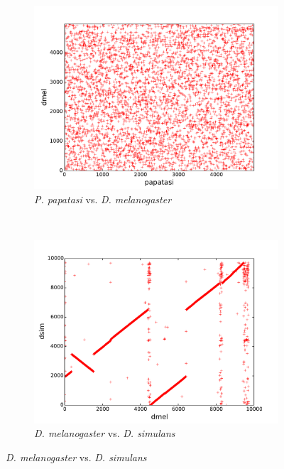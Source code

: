 \begin{figure}[H]
\begin{subfigure}[b]{0.45\textwidth}
    \includegraphics[width=\textwidth]{figures/synteny/papatasi_dmel_plot}
    \caption{\emph{P. papatasi} vs. \emph{D. melanogaster}}
    \label{fig:synteny-dotplots-papatasi-dmel}
  \end{subfigure}
  ~
  \begin{subfigure}[b]{0.45\textwidth}
    \includegraphics[width=\textwidth]{figures/synteny/dmel_dsim_plot}
    \caption{\emph{D. melanogaster} vs. \emph{D. simulans}}

\end{subfigure}
\end{figure}
